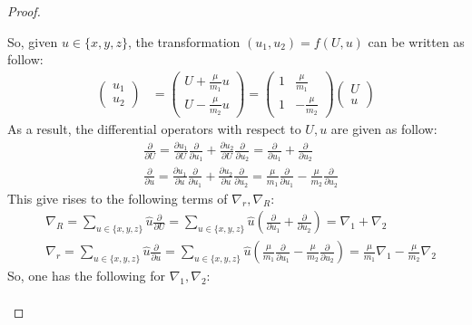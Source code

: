 \documentclass{article}
\begin{document}
\begin{proof}
\begin{itemize}
        So, given $u \in \{x,y,z\}$, the transformation $(u_1,u_2)=f(U,u)$ can be written as follow:
        \begin{align}
            \begin{pmatrix}
                u_1\\u_2
            \end{pmatrix} &= \begin{pmatrix}
                U+\frac{\mu}{m_1}u\\U - \frac{\mu}{m_2}u
            \end{pmatrix} = \begin{pmatrix}
                1&\frac{\mu}{m_1}\\1&-\frac{\mu}{m_2}
            \end{pmatrix}\begin{pmatrix}
                U\\u
            \end{pmatrix}
        \end{align}
        As a result, the differential operators with respect to $U,u$ are given as follow:
        \begin{align}
            &\frac{\partial}{\partial U} = \frac{\partial u_1}{\partial U}\frac{\partial}{\partial u_1} + \frac{\partial u_2}{\partial U}\frac{\partial}{\partial u_2} = \frac{\partial}{\partial u_1}+\frac{\partial}{\partial u_2}\\
            &\frac{\partial}{\partial u} = \frac{\partial u_1}{\partial u}\frac{\partial}{\partial u_1} + \frac{\partial u_2}{\partial u}\frac{\partial}{\partial u_2} = \frac{\mu}{m_1}\frac{\partial}{\partial u_1}-\frac{\mu}{m_2}\frac{\partial}{\partial u_2}
        \end{align}
        This give rises to the following terms of $\nabla_r,\nabla_R$:
        \begin{align}
            &\nabla_R = \sum_{u\in\{x,y,z\} }\hat{u}\frac{\partial}{\partial U} = \sum_{u\in\{x,y,z\} }\hat{u}\left(\frac{\partial}{\partial u_1}+\frac{\partial}{\partial u_2}\right) = \nabla_1+\nabla_2\\
            &\nabla_r = \sum_{u\in\{x,y,z\}}\hat{u}\frac{\partial}{\partial u}=\sum_{u\in\{x,y,z\}}\hat{u}\left(\frac{\mu}{m_1}\frac{\partial}{\partial u_1}-\frac{\mu}{m_2}\frac{\partial}{\partial u_2}\right) = \frac{\mu}{m_1}\nabla_1 - \frac{\mu}{m_2}\nabla_2
        \end{align}
        So, one has the following for $\nabla_1,\nabla_2$:
        \begin{align}

\end{align}
\end{itemize}
\end{proof}
\end{document}
